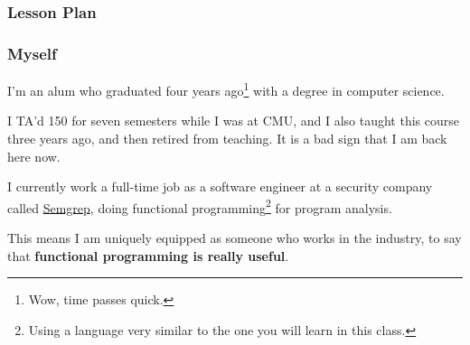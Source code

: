 \documentclass[aspectratio=169, handout]{beamer}
\begin{document}


\begin{frame}[fragile]
  \frametitle{Lesson Plan}

  \tableofcontents
\end{frame}


\begin{frame}[fragile]
  \frametitle{Myself}

  I'm an alum who graduated four years ago\footnote{Wow, time passes quick.} with a degree in computer science.

  \pause
  \vspace{\fill}

  I TA'd 150 for seven semesters while I was at CMU, and I also taught this course
  three years ago, and then retired from teaching. It is a bad sign that I am back here now.

  \pause
  \vspace{\fill}

  I currently work a full-time job as a software engineer at a security company called
  {\color{blue}\href{https://semgrep.dev/}{Semgrep}}, doing functional
  programming\footnote{Using a language very similar to the one you will learn in this class.} for program analysis.

  \pause
  \vspace{\fill}

  This means I am uniquely equipped as someone who works in the industry, to say that
  \textbf{functional programming is really useful}.

  \pause
  \vspace{\fill}

\end{frame}
\end{document}

